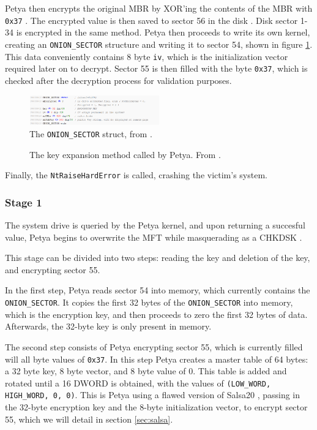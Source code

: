 \documentclass[twocolumn]{article}
\newcommand{\code}[1]{\texttt{#1}}
\begin{document}
Petya then encrypts the original MBR by XOR'ing the contents of the MBR with \code{0x37} \cite{breakingPetya}. The encrypted value is then saved to sector 56 in the disk \cite{xrayPetya}. Disk sector 1-34 is encrypted in the same method. Petya then proceeds to write its own kernel, creating an \code{ONION\_SECTOR} structure and writing it to sector 54, shown in figure \ref{fig:onion_sector}. This data conveniently contains 8 byte \code{iv}, which is the initialization vector required later on to decrypt. Sector 55 is then filled with the byte \code{0x37}, which is checked after the decryption process for validation purposes.

\begin{figure}
	\includegraphics[width = 0.5\textwidth]{onion_sector.png}
	\caption{The \code{ONION\_SECTOR} struct, from \cite{decryptPetya}. }
	\label{fig:onion_sector}	
\end{figure}

\begin{figure}
	
	\caption{The key expansion method called by Petya. From \cite{decryptPetya}.}
	\label{ls:key_expand}
\end{figure}

Finally, the \code{NtRaiseHardError} is called, crashing the victim's system. 

\subsubsection{Stage 1}
\label{sec:stage1}
The system drive is queried by the Petya kernel, and upon returning a succesful value, Petya begins to overwrite the MFT while masquerading as a CHKDSK \cite{xrayPetya}. 

This stage can be divided into two steps: reading the key and deletion of the key, and encrypting sector 55. 

In the first step, Petya reads sector 54 into memory, which currently contains the \code{ONION\_SECTOR}. It copies the first 32 bytes of the \code{ONION\_SECTOR} into memory, which is the encryption key, and then proceeds to zero the first 32 bytes of data. Afterwards, the 32-byte key is only present in memory. 

The second step consists of Petya encrypting sector 55, which is currently filled will all byte values of \code{0x37}. In this step Petya creates a master table of 64 bytes: a 32 byte key, 8 byte vector, and 8 byte value of 0. This table is added and rotated until a 16 DWORD is obtained, with the values of \code{(LOW\_WORD, HIGH\_WORD, 0, 0)}. This is Petya using a flawed version of Salsa20 \cite{salsa20Spec}, passing in the 32-byte encryption key and the 8-byte initialization vector, to encrypt sector 55, which we will detail in section \ref{sec:salsa}. 
\end{document}
